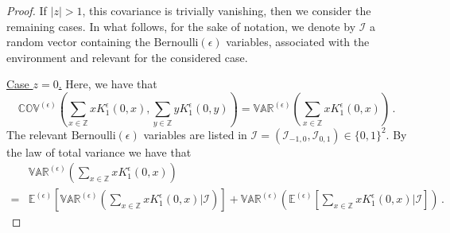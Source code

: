 \documentclass[a4paper,11pt,oneside,reqno]{amsart}
\theoremstyle{definition}
\numberwithin{equation}{section}
\begin{document}
\begin{proof}
	If $|z|>1$, this covariance is trivially vanishing, then we consider the remaining cases. 
In what follows, for the sake of notation, we denote by $\bm{\mathcal{I}}$ a random vector containing the $\text{Bernoulli}(\epsilon)$ variables, associated with the environment and relevant for the considered case. 


\item{\underline{Case $z=0$.}} Here, we have that 
\begin{equation*}
	\mathbb{COV}^{(\epsilon)}\left(\sum_{x\in \mathbb{Z}}x K_{1}^{\epsilon}(0,x),\sum_{y\in \mathbb{Z}}yK_{1}^{\epsilon}(0,y)\right)=\mathbb{VAR}^{(\epsilon)}\left(\sum_{x\in \mathbb{Z}}xK_{1}^{\epsilon}(0,x)\right)\,.
\end{equation*}
The relevant $\text{Bernoulli}(\epsilon)$ variables are listed in  $\bm{\mathcal{I}}=(\mathcal{I}_{-1,0},\mathcal{I}_{0,1})\in \{0,1\}^{2}$. 
By the law of total variance we have that
\begin{equation*}
	\begin{split}
		&\mathbb{VAR}^{(\epsilon)}\left(\sum_{x\in \mathbb{Z}}xK_{1}^{\epsilon}(0,x)\right)
		\\=&\mathbb{E}^{(\epsilon)}\left[\mathbb{VAR}^{(\epsilon)}\left(\sum_{x\in \mathbb{Z}}xK_{1}^{\epsilon}(0,x)\bigg|\bm{\mathcal{I}}\right)\right]+\mathbb{VAR}^{(\epsilon)}\left(\mathbb{E}^{(\epsilon)}\left[\sum_{x\in \mathbb{Z}}xK_{1}^{\epsilon}(0,x)\bigg|\bm{\mathcal{I}}\right]\right)\,.
	\end{split}
\end{equation*}


\end{proof}
\end{document}
